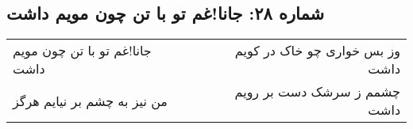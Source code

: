 \begin{center}
\section*{شماره ۲۸: جانا!‌غم تو با تن چون مویم داشت}
\label{sec:028}
\begin{longtable}{l p{0.5cm} r}
جانا!‌غم تو با تن چون مویم داشت
&&
وز بس خواری چو خاک در کویم داشت
\\
من نیز به چشم بر نیایم هرگز
&&
چشمم ز سرشک دست بر رویم داشت
\\
\end{longtable}
\end{center}
